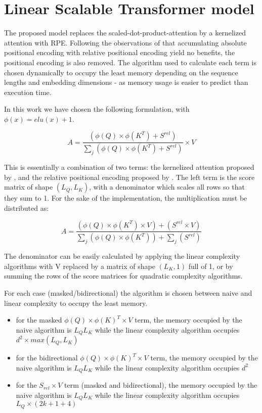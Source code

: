\section{Linear Scalable Transformer
model}

The proposed model replaces the scaled-dot-product-attention by a
kernelized attention with RPE. Following the observations of
\citet{shaw2018selfattention} that
accumulating absolute positional encoding with relative positional
encoding yield no benefits, the positional encoding is also removed. The algorithm used to calculate each term is chosen
dynamically to occupy the least memory depending on the sequence lengths
and embedding dimensions - as memory usage is easier to predict than execution time.

In this work we have chosen the following formulation, with
$\phi(x) = elu(x) + 1$.

\begin{equation}
A = \frac{\left( \phi(Q) \times \phi(K^T) + S^{rel} \right)}{\sum_j \left( \phi(Q) \times \phi(K^T) + S^{rel} \right)} \times V
\end{equation}

This is essentially a combination of two terms: the kernelized attention
proposed by  \citet{katharopoulos2020transformers}, and the relative positional encoding proposed by
\citet{shaw2018selfattention}. The left
term is the score matrix of shape $(L_Q, L_K)$, with a denominator
which scales all rows so that they sum to 1. For the sake of the
implementation, the multiplication must be distributed as:

\begin{equation}
A = \frac{\left( \phi(Q) \times \phi(K^T) \times V \right) + \left( S^{rel} \times V\right)}{\sum_j \left( \phi(Q) \times \phi(K^T) \right) + \sum_j \left( S^{rel} \right)}
\end{equation}

The denominator can be easily calculated by applying the linear complexity algorithms with V replaced by a matrix of shape
$(L_K, 1)$ full of 1, or by summing the rows of the score matrices for quadratic complexity algorithms.

For each case (masked/bidirectional) the algorithm is chosen between
naive and linear complexity to occupy the least memory.

\begin{itemize}
\item
for the masked $\phi(Q) \times \phi(K)^T \times V$ term, the memory occupied by
the naive algorithm is $L_QL_K$ while the linear complexity
algorithm occupies $d^2 \times max(L_Q, L_K)$
\item
for the bidirectional $\phi(Q) \times \phi(K)^T \times V$ term, the memory
occupied by the naive algorithm is $L_QL_K$ while the linear
complexity algorithm occupies $d^2$
\item
for the $S_{rel} \times V$ term (masked and bidirectional), the
memory occupied by the naive algorithm is $L_QL_K$ while the linear
complexity algorithm occupies $L_Q \times (2k+1 + 4)$
\end{itemize}

\endinput
